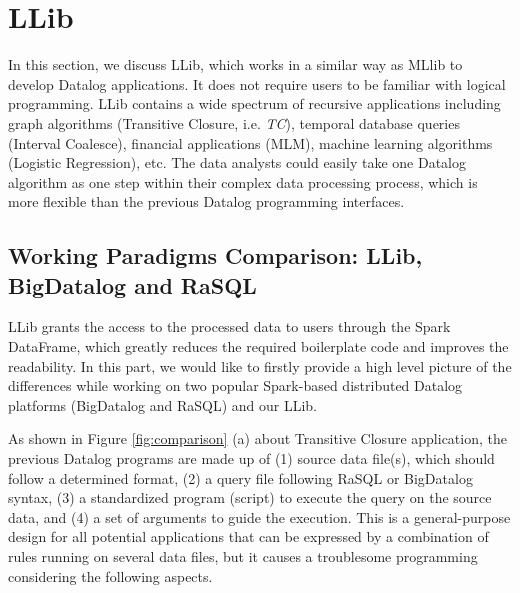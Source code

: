  
\section{LLib}
\label{llib}
In this section, we discuss LLib, which works in a similar way as MLlib to develop Datalog applications. It does not require  users to be familiar with logical programming. LLib contains a wide spectrum of recursive applications including graph algorithms (Transitive Closure, i.e. \textit{TC}), temporal database queries (Interval Coalesce), financial applications (MLM),  machine learning algorithms (Logistic Regression), etc. 
The data analysts could easily take one Datalog algorithm as one step within their complex data processing process, which is more flexible than the previous Datalog programming interfaces. 











\subsection{Working Paradigms Comparison: LLib, BigDatalog and RaSQL}
\label{sec:paradigm}

LLib grants the access to the processed data to users through the Spark DataFrame, which greatly reduces the required boilerplate code and improves  the readability. In this part, we would like to firstly provide a high level picture of the differences while working on two popular Spark-based distributed Datalog platforms (BigDatalog and RaSQL) and our LLib. 

As shown in Figure \ref{fig:comparison} (a) about Transitive Closure application, the previous Datalog programs are made up of (1)  source data file(s), which should follow a determined format, (2) a query file following RaSQL or BigDatalog syntax, (3) a standardized program (script) to execute the query on the source data, and (4) a set of arguments to guide the execution. This is a general-purpose design for all potential applications that can be expressed by a combination of rules running on several data files, but it causes a troublesome programming considering the following aspects.


